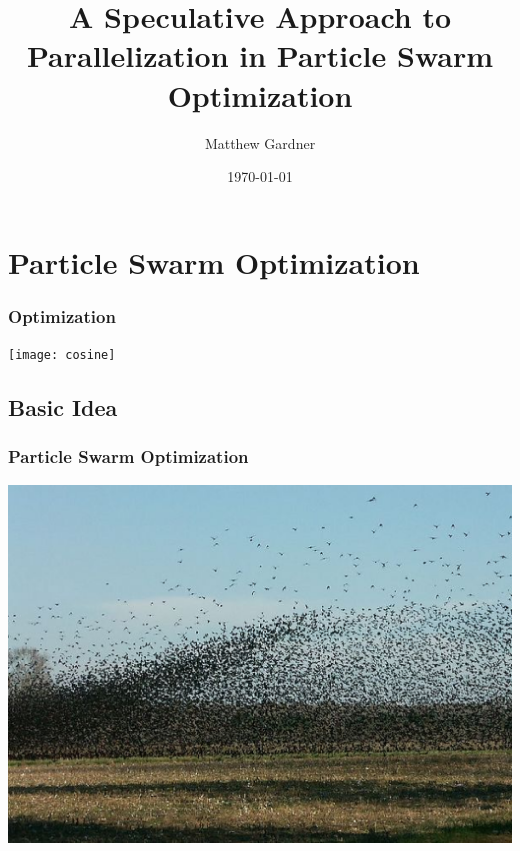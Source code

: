 \documentclass{beamer}
\title[A Speculative Approach to Parallelization in PSO]{A Speculative Approach
to Parallelization in Particle Swarm Optimization}
\author{Matthew Gardner}
\date{\today}
\begin{document}
\begin{frame}
  \titlepage
\end{frame}

\section{Particle Swarm Optimization}
\begin{frame}
  \frametitle{Optimization}
  \begin{center}
	\texttt{[image: cosine]}
  \end{center}
\end{frame}

\subsection{Basic Idea}
\begin{frame}
  \frametitle{Particle Swarm Optimization}
  \begin{center}
	\includegraphics[width=.8\textwidth]{birds}
  \end{center}
\end{frame}
\end{document}
